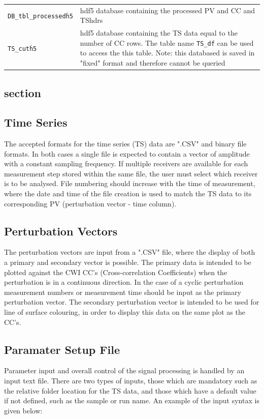 \documentclass{article}
\begin{document}
\begin{tabular}{l|p{120mm}}
\texttt{DB\_tbl\_processed\.h5} & hdf5 database containing the processed PV and CC and TShdrs\\
\texttt{TS\_cut\.h5} & hdf5 database containing the TS data equal to the number of CC rows. The table name \texttt{TS\_df} can be used to access the this table. Note: this databased is saved in "fixed" format and therefore cannot be queried\\
\end{tabular}
\newline

\subsection{section}

\subsection{Time Series}
The accepted formats for the time series (TS) data are ".CSV" and binary file formats. In both cases a single file is expected to contain a vector of amplitude with a constant sampling frequency. If multiple receivers are available for each measurement step stored within the same file, the user must select which receiver is to be analysed. File numbering should increase with the time of measurement, where the date and time of the file creation is used to match the TS data to its corresponding PV (perturbation vector - time column).

\subsection{Perturbation Vectors}
The perturbation vectors are input from a ".CSV" file, where the display of both a primary and secondary vector is possible. The primary data is intended to be plotted against the CWI CC's (Cross-correlation Coefficients) when the perturbation is in a continuous direction. In the case of a cyclic perturbation measurement numbers or measurement time should be input as the primary perturbation vector. The secondary perturbation vector is intended to be used for line of surface colouring, in order to display this data on the same plot as the CC's. 

\subsection{Paramater Setup File}
Parameter input and overall control of the signal processing is handled by an input text file. There are two types of inputs, those which are mandatory such as the relative folder location for the TS data, and those which have a default value if not defined, such as the sample or run name. An example of the input syntax is given below:
\end{document}
